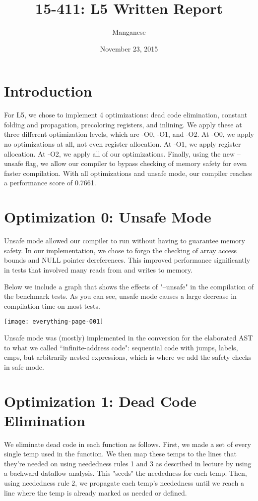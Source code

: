 \documentclass{article}
\title{15-411: L5 Written Report}
\author{Manganese}
\date{November 23, 2015}
\begin{document}
\maketitle

\section{Introduction}

For L5, we chose to implement 4 optimizations: dead code elimination, constant folding and propagation, precoloring registers, and inlining. We apply these at three different optimization levels, which are -O0, -O1, and -O2. At -O0, we apply no optimizations at all, not even register allocation. At -O1, we apply register allocation. At -O2, we apply all of our optimizations. Finally, using the new --unsafe flag, we allow our compiler to bypass checking of memory safety for even faster compilation. With all optimizations and unsafe mode, our compiler reaches a performance score of 0.7661.

\section{Optimization 0: Unsafe Mode}

Unsafe mode allowed our compiler to run without having to guarantee memory safety. In our implementation, we chose to forgo the checking of array access bounds and NULL pointer dereferences. This improved performance significantly in tests that involved many reads from and writes to memory. 

Below we include a graph that shows the effects of "--unsafe" in the compilation of the benchmark tests. As you can see, unsafe mode causes a large decrease in compilation time on most tests. 

\texttt{[image: everything-page-001]}

Unsafe mode was (mostly) implemented in the conversion for the elaborated AST to what we called ``infinite-address code": sequential code with jumps, labels, cmps, but arbitrarily nested expressions, which is where we add the safety checks in safe mode.

\section{Optimization 1: Dead Code Elimination}

We eliminate dead code in each function as follows. First, we made a set of every single temp used in the function. We then map these temps to the lines that they're needed on using neededness rules 1 and 3 as described in lecture by using a backward dataflow analysis. This "seeds" the neededness for each temp. Then, using neededness rule 2, we propagate each temp's neededness until we reach a line where the temp is already marked as needed or defined. 
\end{document}
